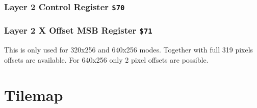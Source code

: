 \documentclass[12pt,twoside,openright,a4paper]{book}
\begin{document}
\subsubsection{Layer 2 Control Register {\tt \$70}}

\begin{NextPort}
\end{NextPort}


\subsubsection{Layer 2 X Offset MSB Register {\tt \$71}}

\begin{NextPort}
\end{NextPort}

This is only used for 320x256 and 640x256 modes. Together with  full 319 pixels offsets are available. For 640x256 only 2 pixel offsets are possible.


\pagebreak
\section{Tilemap}
\label{zx_next_tilemap}

\end{document}
